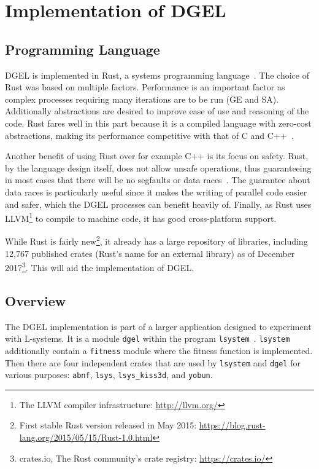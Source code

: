\chapter[Implementation of DGEL]{Implementation of \gls{DGEL}}
\section{Programming Language}
\gls{DGEL} is implemented in Rust, a systems programming language~\cite{Rust}.
The choice of Rust was based on multiple factors.
Performance is an important factor as complex processes requiring many iterations are to be run (\gls{GE} and \gls{SA}).
Additionally abstractions are desired to improve ease of use and reasoning of the code.
Rust fares well in this part because it is a compiled language with zero-cost abstractions, making its performance competitive with that of C and C++~\cite{RustFaq}.

Another benefit of using Rust over for example C++ is its focus on safety.
Rust, by the language design itself, does not allow unsafe operations, thus guaranteeing in most cases that there will be no segfaults or data races~\cite{RustSafe,Rust,RustRace}.
The guarantee about data races is particularly useful since it makes the writing of parallel code easier and safer, which the \gls{DGEL} processes can benefit heavily of.
Finally, as Rust uses LLVM\footnote{The LLVM compiler infrastructure: \url{http://llvm.org/}} to compile to machine code, it has good cross-platform support.

While Rust is fairly new\footnote{First stable Rust version released in May 2015: \url{https://blog.rust-lang.org/2015/05/15/Rust-1.0.html}}, it already has a large repository of libraries, including 12,767 published crates (Rust's name for an external library) as of December 2017\footnote{crates.io, The Rust community’s crate registry: \url{https://crates.io/}}.
This will aid the implementation of \gls{DGEL}.

\section{Overview}
The \gls{DGEL} implementation is part of a larger application designed to experiment with \glspl{L-system}.
It is a module \texttt{dgel} within the program \texttt{lsystem}~\cite{CodeLsystem}.
\texttt{lsystem} additionally contain a \texttt{fitness} module where the fitness function is implemented.
Then there are four independent crates that are used by \texttt{lsystem} and \texttt{dgel} for various purposes: \texttt{abnf}, \texttt{lsys}, \texttt{lsys\_kiss3d}, and \texttt{yobun}.

